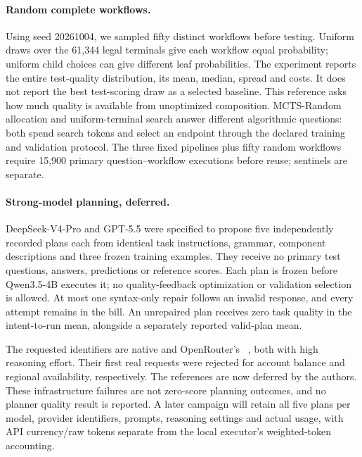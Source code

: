 \paragraph{Random complete workflows.}
Using seed 20261004, we sampled fifty distinct workflows before testing.
Uniform draws over the 61,344 legal terminals give each workflow equal
probability; uniform child choices can give different leaf probabilities.
The experiment reports the entire test-quality distribution, its mean,
median, spread and costs. It does not report the best test-scoring draw as
a selected baseline. This reference asks how much quality is available from
unoptimized composition. MCTS-Random allocation and uniform-terminal search
answer different algorithmic questions: both spend search tokens and select
an endpoint through the declared training and validation protocol.
The three fixed pipelines plus fifty random workflows require 15,900 primary
question--workflow executions before reuse; sentinels are separate.

\paragraph{Strong-model planning, deferred.}
DeepSeek-V4-Pro and GPT-5.5 were specified to propose five independently
recorded plans each from identical task instructions, grammar, component
descriptions and three frozen training examples. They receive no primary
test questions, answers, predictions or reference scores. Each plan is
frozen before Qwen3.5-4B executes it; no quality-feedback optimization or
validation selection is allowed. At most one syntax-only repair follows an
invalid response, and every attempt remains in the bill. An unrepaired
plan receives zero task quality in the intent-to-run mean, alongside a
separately reported valid-plan mean.

The requested identifiers are native  and OpenRouter's
~\citep{deepseek2026v4pro,openai2026gpt55}, both with
high reasoning effort. Their first real requests were rejected for account
balance and regional availability, respectively. The references are now
deferred by the authors. These infrastructure failures are not zero-score
planning outcomes, and no planner quality result is reported. A later
campaign will retain all five plans per model, provider identifiers, prompts,
reasoning settings and actual usage, with API currency/raw tokens separate
from the local executor's weighted-token accounting.


